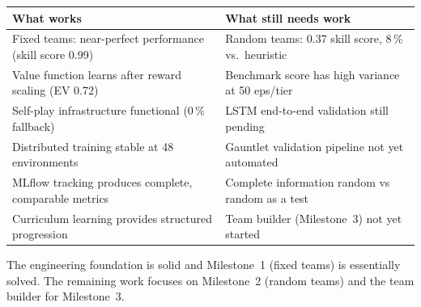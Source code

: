 \begin{center}
\small
\begin{tabularx}{\textwidth}{l X}
  \toprule
  \textbf{What works} & \textbf{What still needs work} \\
  \midrule
  Fixed teams: near-perfect performance (skill score 0.99) &
    Random teams: 0.37 skill score, 8\,\% vs.\ heuristic \\
  Value function learns after reward scaling (EV 0.72) &
    Benchmark score has high variance at 50 eps/tier \\
  Self-play infrastructure functional (0\,\% fallback) &
    LSTM end-to-end validation still pending \\
  Distributed training stable at 48 environments &
    Gauntlet validation pipeline not yet automated \\
  MLflow tracking produces complete, comparable metrics &
    Complete information random vs random as a test \\
  Curriculum learning provides structured progression &
    Team builder (Milestone~3) not yet started \\
  \bottomrule
\end{tabularx}
\end{center}

The engineering foundation is solid and Milestone~1 (fixed teams) is
essentially solved.  The remaining work focuses on Milestone~2 (random teams)
and the team builder for Milestone~3.
